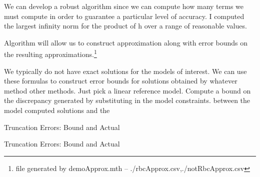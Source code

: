 \documentclass[12pt]{article}
\begin{document}
We can develop a robust algorithm since we can compute how many terms
we must compute in order to guarantee a particular level of accuracy.
I computed the largest infinity norm for the product of h over a range of
reasonable values.  

Algorithm will allow us to construct approximation along with error bounds on the resulting approximations.\footnote{file generated by demoApprox.mth -- {./rbcApprox.csv,./notRbcApprox.csv}}


We typically do not have exact solutions for the models of interest.
We can use these formulas to construct error bounds for solutions obtained by 
whatever method other methods.
Just pick a linear reference model.  Compute a bound on the discrepancy 
generated by substituting in the model constraints. between the model computed solutions and the 




 \begin{table}
   \centering
    


   \caption{Truncation Errors: Bound and Actual}
 \label{truncTab}
 \end{table}



 \begin{table}
   \centering




   \caption{Truncation Errors: Bound and Actual}

 \end{table}
\end{document}
